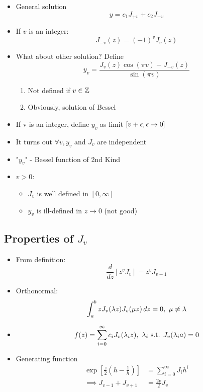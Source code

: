 \documentclass[Maths.tex]{subfiles}
\begin{document}
\begin{itemize}
\begin{equation}
	\end{equation}
	\item General solution
	\begin{equation}
		y = c_1J_{+v} + c_2J_{-v}
	\end{equation}
	\item If $v$ is an integer:
	\begin{equation}
		J_{-v}(z) = (-1)^vJ_v(z)
	\end{equation}
	\item What about other solution? Define
	\begin{equation}
		y_v = \frac{J_v(z)\cos(\pi v) - J_{-v}(z)}{\sin(\pi v)}
	\end{equation}
	\begin{enumerate}
		\item Not defined if $v \in \mathbb{Z}$
		\item Obviously, solution of Bessel
	\end{enumerate}
	\item If v is an integer, define $y_v$ as limit $[v+\epsilon, \epsilon \to 0]$
	\item It turns out $\forall v, y_v$ and $J_v$ are independent
	\item "$y_v$" - Bessel function of 2nd Kind
	\item $v > 0$:
	\begin{itemize}
		\item $J_v$ is well defined in $[0,\infty]$
		\item $y_v$ is ill-defined in $z \to 0$ (not good)
	\end{itemize}
\end{itemize}

\subsection{Properties of $J_v$}
\begin{itemize}
	\item From definition:
	\begin{equation}
		\frac{d}{dz}[z^vJ_v] = z^vJ_{v-1}
	\end{equation}
	\item Orthonormal:
	\begin{equation}
		\int_{a}^{b} zJ_v(\lambda z)J_v(\mu z)\,dz = 0,~ \mu \neq \lambda
	\end{equation}
	\item
	\begin{equation}
		f(z) = \sum_{i=0}^\infty c_iJ_v(\lambda_i z),~ \lambda_i \text{ s.t. } J_v(\lambda_i a) = 0
	\end{equation}
	\item Generating function
	\begin{align}
		\exp\left[\frac{z}{2}\left(h - \frac{1}{h}\right)\right] &= \sum_{i=0}^\infty J_ih^i \\
		\implies J_{v-1} + J_{v+1} &= \frac{2v}{2}J_v
	\end{align}
\end{itemize}
\end{document}
